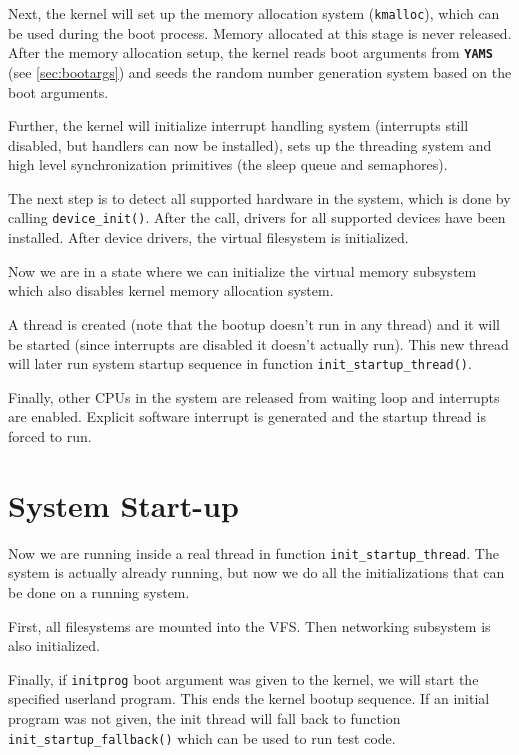 \documentclass[twoside,a4paper]{report}
\newcommand{\yams}{\texttt{\textbf{YAMS}}}
\begin{document}
Next, the kernel will set up the memory allocation system
(\texttt{kmalloc}), which can be used during the boot process. Memory
allocated at this stage is never released. After the memory allocation
setup, the kernel reads boot arguments from \yams{} (see
\autoref{sec:bootargs}) and seeds the random number generation system
based on the boot arguments.

Further, the kernel will initialize interrupt handling system
(interrupts still disabled, but handlers can now be installed), sets up
the threading system and high level synchronization primitives (the sleep
queue and semaphores).

The next step is to detect all supported hardware in the system, which
is done by calling \texttt{device\_init()}. After the call, drivers
for all supported devices have been installed. After device drivers,
the virtual filesystem is initialized.

Now we are in a state where we can initialize the virtual memory
subsystem which also disables kernel memory allocation system. 

A thread is created (note that the bootup doesn't run in any thread)
and it will be started (since interrupts are disabled it doesn't
actually run). This new thread will later run system startup sequence
in function
\texttt{init\_startup\_thread()}.

Finally, other CPUs in the system are released from waiting loop and
interrupts are enabled. Explicit software interrupt is generated and
the startup thread is forced to run.

\section{System Start-up}


Now we are running inside a real thread in function
\texttt{init\_startup\_thread}. The system is actually already
running, but now we do all the initializations that can be done on a
running system.

First, all filesystems are mounted into the VFS. Then networking
subsystem is also initialized.

Finally, if \texttt{initprog} boot argument was given to the kernel,
we will start the specified userland program. This ends the kernel
bootup sequence. If an initial program was not given, the init thread
will fall back to function \texttt{init\_startup\_fallback()} which
can be used to run test code.
\end{document}
